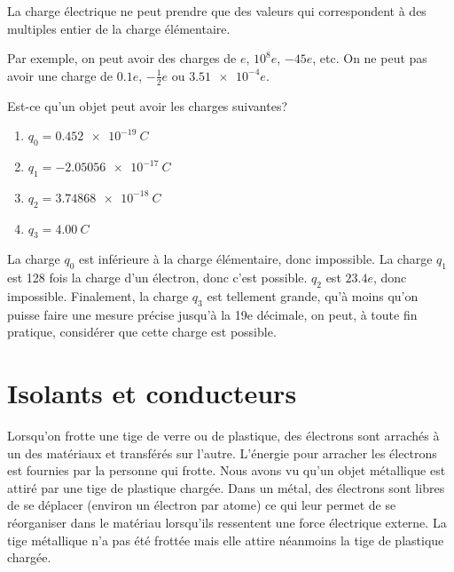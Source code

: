 \begin{fondamentalbox}

  La charge électrique ne peut prendre que des valeurs qui correspondent à des
  multiples entier de la charge élémentaire.
\end{fondamentalbox}

Par exemple, on peut avoir des charges de $e$, $10^{8}e$, $-45e$, etc. On ne
peut pas avoir une charge de $0.1e$, $-\frac{1}{2}e$ ou $\num{3.51e-4}e$.


\begin{diapobox}
  Est-ce qu'un objet peut avoir les charges suivantes?

  \begin{enumerate}
    \item $q_0 = \SI{0.452e-19}{C}$
    \item $q_1 = \SI{-2.05056e-17}{C}$
    \item $q_2 = \SI{3.74868e-18}{C}$
    \item $q_3 = \SI{4.00}{C}$
  \end{enumerate}
\end{diapobox}

\begin{reponsebox}
  La charge $q_0$ est inférieure à la charge élémentaire, donc impossible. La
  charge $q_1$ est 128 fois la charge d'un électron, donc c'est possible. $q_2$
  est $23.4e$, donc impossible. Finalement, la charge $q_3$ est tellement
  grande, qu'à moins qu'on puisse faire une mesure précise jusqu'à la 19e
  décimale, on peut, à toute fin pratique, considérer que cette charge est
  possible.
\end{reponsebox}


\sectionline

\clearpage


\section{Isolants et conducteurs}
Lorsqu'on frotte une tige de verre ou de plastique, des électrons sont arrachés
à un des matériaux et transférés sur l'autre. L'énergie pour arracher les
électrons est fournies par la personne qui frotte. Nous avons vu qu'un objet
métallique est attiré par une tige de plastique chargée. Dans un métal, des
électrons sont libres de se déplacer (environ un électron par atome) ce qui
leur permet de se réorganiser dans le matériau lorsqu'ils ressentent une force
électrique externe.  La tige métallique n'a pas été frottée mais elle attire
néanmoins la tige de plastique chargée.


